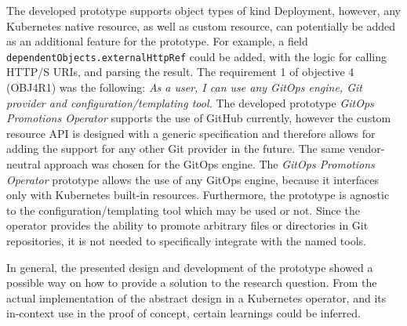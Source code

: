 The developed prototype supports object types of kind Deployment,
however, any Kubernetes native resource, as well as custom resource, can potentially be added as an
additional feature for the prototype.
For example, a field \lstinline|dependentObjects.externalHttpRef| could be added,
with the logic for calling HTTP/S URIs, and parsing the result.
The requirement 1 of objective 4 (OBJ4R1) was the following:
\textit{As a user, I can use any GitOps engine, Git provider and configuration/templating tool.}
The developed prototype \textit{GitOps Promotions Operator} supports the use of GitHub currently,
however the custom resource API is designed with a generic specification and therefore allows
for adding the support for any other Git provider in the future.
The same vendor-neutral approach was chosen for the GitOps engine.
The \textit{GitOps Promotions Operator} prototype allows the use of any GitOps engine,
because it interfaces only with Kubernetes built-in resources.
Furthermore, the prototype is agnostic to the configuration/templating tool which may be used or not.
Since the operator provides the ability
to promote arbitrary files or directories in Git repositories, it is not needed to specifically integrate
with the named tools.

In general, the presented design and development of the prototype
showed a possible way on how to provide a solution to the research question.
From the actual implementation of the abstract design in a Kubernetes operator,
and its in-context use in the proof of concept,
certain learnings could be inferred.


